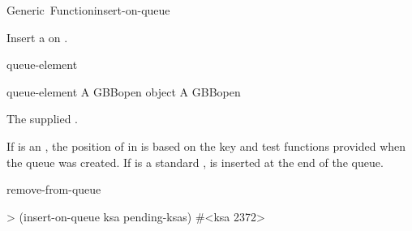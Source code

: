 \documentclass[10pt,twoside,english,pdftex]{article}
\begin{document}
\begin{functiondoc}{Generic~Function}{insert-on-queue}%
  {
    \returns{} }
%
%
%

\fnsyntax

\fnpurpose Insert a  on .

\fnmethods
{}%
  {\code{(} queue-element\code{)}
  \code{(} 
  \returns{} }
%
  {\code{(} 
  \code{(}  
  \returns{} }

\fnpackage {}

\fnmodule {}

\fnargs
\begin{args}{queue-element}
 A GBBopen  object
\arg[queue] A GBBopen 
\end{args}

\fnreturns The supplied .

\fndescription If  is an
, the position of  in
 is based on the key and test functions provided when the
queue was created.  If  is a standard ,
 is inserted at the end of the queue.
  
\begin{alsos}{remove-from-queue}
\end{alsos}

\fnexample
%
\W\supp
\begin{example}
> (insert-on-queue ksa pending-ksas)
#<ksa 2372>
\end{example}

\end{functiondoc}

\end{document}
